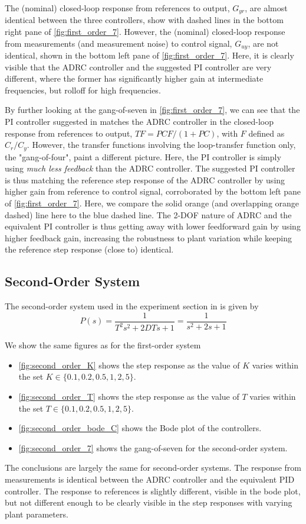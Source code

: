 \documentclass[letterpaper, 10 pt, conference]{ieeeconf}
\begin{document}
The (nominal) closed-loop response from references to output, $G_{yr}$, are almost identical between the three controllers, show with dashed lines in the bottom right pane of \cref{fig:first_order_7}. However, the (nominal) closed-loop response from measurements (and measurement noise) to control signal, $G_{uy}$, are not identical, shown in the bottom left pane of \cref{fig:first_order_7}. Here, it is clearly visible that the ADRC controller and the suggested PI controller are very different, where the former has significantly higher gain at intermediate frequencies, but rolloff for high frequencies.

By further looking at the gang-of-seven in \cref{fig:first_order_7}, we can see that the PI controller suggested in \cite{herbst2013simulative} matches the ADRC controller in the closed-loop response from references to output, $TF = PCF/(1 + PC)$, with $F$ defined as $C_r/C_y$. However, the transfer functions involving the loop-transfer function only, the "gang-of-four", paint a different picture. Here, the PI controller is simply using \emph{much less feedback} than the ADRC controller. The suggested PI controller is thus matching the reference step response of the ADRC controller by using higher gain from reference to control signal, corroborated by the bottom left pane of \cref{fig:first_order_7}. Here, we compare the solid orange (and overlapping orange dashed) line here to the blue dashed line. The 2-DOF nature of ADRC and the equivalent PI controller is thus getting away with lower feedforward gain by using higher feedback gain, increasing the robustness to plant variation while keeping the reference step response (close to) identical.



\subsection{Second-Order System}
The second-order system used in the experiment section in \cite{herbst2013simulative} is given by
$$P(s) = \dfrac{1}{T^2s^2 + 2DTs + 1} = \dfrac{1}{s^2 + 2s + 1}$$

We show the same figures as for the first-order system
\begin{itemize}
	\item \cref{fig:second_order_K} shows the step response as the value of $K$ varies within the set $K \in \{0.1, 0.2, 0.5, 1, 2, 5\}$.
	\item \cref{fig:second_order_T} shows the step response as the value of $T$ varies within the set $T \in \{0.1, 0.2, 0.5, 1, 2, 5\}$.
	\item \cref{fig:second_order_bode_C} shows the Bode plot of the controllers.
	\item \cref{fig:second_order_7} shows the gang-of-seven for the second-order system.
\end{itemize}
The conclusions are largely the same for second-order systems. The response from measurements is identical between the ADRC controller and the equivalent PID controller. The response to references is slightly different, visible in the bode plot, but not different enough to be clearly visible in the step responses with varying plant parameters.
\end{document}
